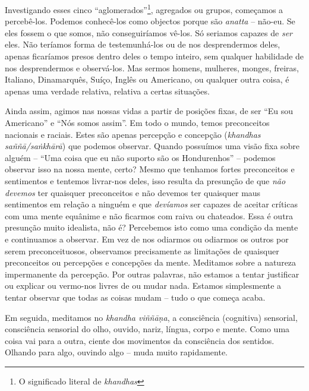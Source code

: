 Investigando esses cinco ``aglomerados''\footnote{O significado literal de
  \emph{khandhas}}, agregados ou grupos, começamos a percebê-los. Podemos
conhecê-los como objectos porque são \emph{anatta} -- não-eu. Se eles fossem o
que somos, não conseguiríamos vê-los. Só seriamos capazes de \emph{ser} eles.
Não teríamos forma de testemunhá-los ou de nos desprendermos deles, apenas
ficaríamos presos dentro deles o tempo inteiro, sem qualquer habilidade de nos
desprendermos e observá-los. Mas sermos homens, mulheres, monges, freiras,
Italiano, Dinamarquês, Suíço, Inglês ou Americano, ou qualquer outra coisa, é
apenas uma verdade relativa, relativa a certas situações.

Ainda assim, agimos nas nossas vidas a partir de posições fixas, de ser ``Eu sou
Americano'' e ``Nós somos assim''. Em todo o mundo, temos preconceitos nacionais
e raciais. Estes são apenas percepção e concepção (\emph{khandhas
  saññā/saṅkhārā}) que podemos observar. Quando possuímos uma visão fixa sobre
alguém -- ``Uma coisa que eu não suporto são os Hondurenhos'' -- podemos
observar isso na nossa mente, certo? Mesmo que tenhamos fortes preconceitos e
sentimentos e tentemos livrar-nos deles, isso resulta da presunção de que
\emph{não devemos} ter quaisquer preconceitos e não devemos ter quaisquer maus
sentimentos em relação a ninguém e que \emph{devíamos} ser capazes de aceitar
críticas com uma mente equânime e não ficarmos com raiva ou chateados. Essa é
outra presunção muito idealista, não é? Percebemos isto como uma condição da
mente e continuamos a observar. Em vez de nos odiarmos ou odiarmos os outros por
serem preconceituosos, observamos precisamente as limitações de quaisquer
preconceitos ou percepções e concepções da mente. Meditamos sobre a natureza
impermanente da percepção. Por outras palavras, não estamos a tentar justificar
ou explicar ou vermo-nos livres de ou mudar nada. Estamos simplesmente a tentar
observar que todas as coisas mudam -- tudo o que começa acaba.

Em seguida, meditamos no \emph{khandha viññāṇa}, a consciência (cognitiva)
sensorial, consciência sensorial do olho, ouvido, nariz, língua, corpo e mente.
Como uma coisa vai para a outra, ciente dos movimentos da consciência dos
sentidos. Olhando para algo, ouvindo algo -- muda muito rapidamente.

